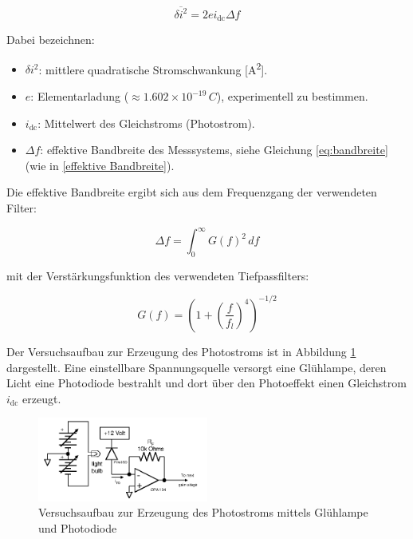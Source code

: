 \begin{equation}
    \overline{\delta i^2} = 2 e i_{\text{dc}} \Delta f
    \label{Schottky}
\end{equation}

Dabei bezeichnen:
\begin{itemize}
    \item \( \delta i^2 \): mittlere quadratische Stromschwankung [A\textsuperscript{2}].
    \item \( e \): Elementarladung (\( \approx 1{.}602 \times 10^{-19} \, \si{C} \)), experimentell zu bestimmen.
    \item \( i_{\text{dc}} \): Mittelwert des Gleichstroms (Photostrom).
    \item \( \Delta f \): effektive Bandbreite des Messsystems, siehe Gleichung \ref{eq:bandbreite} (wie in \cref{effektive Bandbreite}).
\end{itemize}

Die effektive Bandbreite ergibt sich aus dem Frequenzgang der verwendeten Filter:

\begin{equation}
    \Delta f = \int_0^\infty G(f)^2 \, df
    \label{eq:bandbreite}
\end{equation}

mit der Verstärkungsfunktion des verwendeten Tiefpassfilters:

\begin{equation}
    G(f) = \left( 1 + \left( \frac{f}{f_l} \right)^4 \right)^{-1/2}
\end{equation}

Der Versuchsaufbau zur Erzeugung des Photostroms ist in Abbildung \ref{fig:schrotschaltung} dargestellt. 
Eine einstellbare Spannungsquelle versorgt eine Glühlampe, deren Licht eine Photodiode bestrahlt und dort über den Photoeffekt einen Gleichstrom \( i_{\text{dc}} \) erzeugt.

\FloatBarrier
\begin{figure}[htbp]
    \centering
    \includegraphics[width=0.5\textwidth]{figs/schrot schaltung.png}
    \caption{Versuchsaufbau zur Erzeugung des Photostroms mittels Glühlampe und Photodiode \cite{praktikum}}
    \label{fig:schrotschaltung}
\end{figure}
\FloatBarrier

